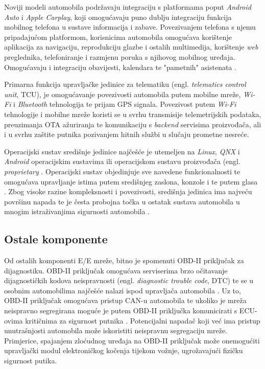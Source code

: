 \documentclass[times, utf8, diplomski, numeric]{fer}
\begin{document}
Noviji modeli automobila podržavaju integraciju s platformama poput \textit{Android Auto} i \textit{Apple Carplay}, koji omogućavaju puno dublju integraciju funkcija mobilnog telefona u sustave informacija i zabave. Povezivanjem telefona s njemu pripadajućom platformom, korisnicima automobila omogućava korištenje aplikacija za navigaciju, reprodukciju glazbe i ostalih multimedija, korištenje \textit{web} preglednika, telefoniranje i razmjenu poruka s njihovog mobilnog uređaja. Omogućavaju i integraciju obavijesti, kalendara te "pametnih" asistenata \cite{androidauto, carplay}.

Primarna funkcija upravljačke jedinice za telematiku (engl. \textit{telematics control unit}, TCU), je omogućavanje povezivosti automobila putem mobilne mreže, \textit{Wi-Fi} i \textit{Bluetooth} tehnologija te prijam GPS signala\cite{nasser2023automotive}. Povezivost putem \textit{Wi-Fi} tehnologije i mobilne mreže koristi se u svrhu transmisije telemetrijskih podataka, preuzimanja OTA ažuriranja te komunikaciju s \textit{backend} servisima proizvođača, ali i u svrhu zaštite putnika pozivanjem hitnih službi u slučaju prometne nesreće.

Operacijski sustav središnje jedinice najčešće je utemeljen na \textit{Linux}, \textit{QNX} i \textit{Android} operacijskim sustavima ili operacijskom sustavu proizvođača (engl. \textit{proprietary} \cite{nasser2023automotive}. Operacijski sustav objedinjuje sve navedene funkcionalnosti te omogućava upravljanje istima putem središnjeg zaslona, konzole i te putem glasa \cite{bosch2022handbook}. Zbog visoke razine kompleksnosti i povezivosti, središnja jedinica ima najveću površinu napada te je česta probojna točka u ostatak sustava automobila u mnogim istraživanjima sigurnosti automobila \cite{aliwa2021cyberattacks, knight2020hacking, smith2016car, tencent2018bmw, miller2015remote}.

\subsection{Ostale komponente}
Od ostalih komponenti E/E mreže, bitno je spomenuti OBD-II priključak za dijagnostiku. OBD-II priključak omogućava serviserima brzo očitavanje dijagnostičkih kodova neispravnosti (engl. \textit{diagnostic trouble code}, DTC) te se u osobnim automobilima najčešće nalazi ispod upravljača automobila \cite{smith2016car}. Uz to, OBD-II priključak omogućava pristup CAN-u automobila te ukoliko je mreža neispravno segregirana moguće je putem OBD-II priključka  komunicirati s ECU-ovima kritičnima za sigurnost putnika \cite{knight2020hacking, smith2016car}. Potencijalni napadač koji već ima pristup unutrašnjosti automobila može iskoristiti neispravnu segregaciju mreže. Primjerice, spajanjem zloćudnog uređaja na OBD-II priključak može onemogućiti upravljački modul elektroničkog kočenja tijekom vožnje, ugrožavajući fizičku sigurnost putika.  
\end{document}
